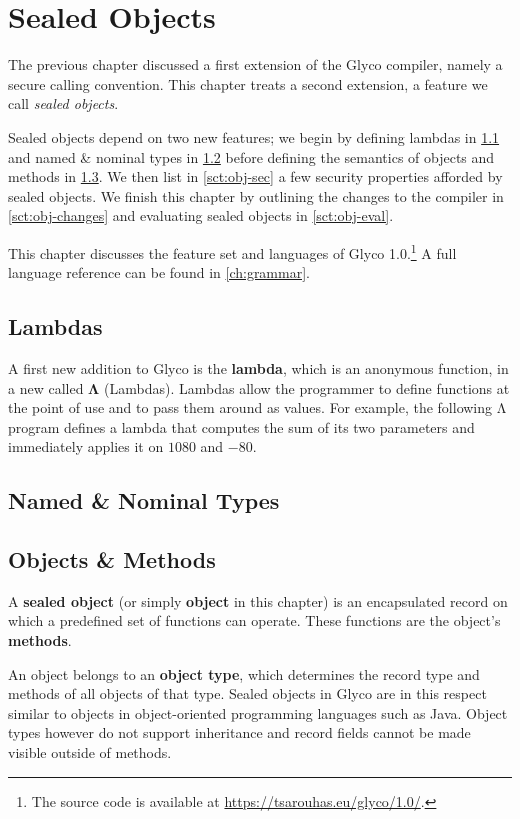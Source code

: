 \documentclass[main.tex]{subfiles}
\begin{document}
\onlyinsubfile{\mainmatter{}}

\chapter{Sealed Objects}
The previous chapter discussed a first extension of the Glyco compiler, namely a secure calling convention. This chapter treats a second extension, a feature we call \emph{sealed objects}.

Sealed objects depend on two new features; we begin by defining lambdas in \cref{sct:lambda} and named \& nominal types in \cref{sct:named-ty} before defining the semantics of objects and methods in \cref{sct:obj-meth}. We then list in \cref{sct:obj-sec} a few security properties afforded by sealed objects. We finish this chapter by outlining the changes to the compiler in \cref{sct:obj-changes} and evaluating sealed objects in \cref{sct:obj-eval}.

This chapter discusses the feature set and languages of Glyco 1.0.\footnote{The source code is available at \url{https://tsarouhas.eu/glyco/1.0/}.} A full language reference can be found in \cref{ch:grammar}.

\section{Lambdas} \label{sct:lambda}
A first new addition to Glyco is the \textbf{lambda}, which is an anonymous function, in a new  called \textbf{Λ} (Lambdas). Lambdas allow the programmer to define functions at the point of use and to pass them around as values. For example, the following Λ program defines a lambda that computes the sum of its two parameters and immediately applies it on $1080$ and $-80$.


\section{Named \& Nominal Types} \label{sct:named-ty}

\section{Objects \& Methods} \label{sct:obj-meth}
A \textbf{sealed object} (or simply \textbf{object} in this chapter) is an encapsulated record on which a predefined set of functions can operate. These functions are the object's \textbf{methods}.

An object belongs to an \textbf{object type}, which determines the record type and methods of all objects of that type. Sealed objects in Glyco are in this respect similar to objects in object-oriented programming languages such as Java. Object types however do not support inheritance and record fields cannot be made visible outside of methods.
\end{document}

